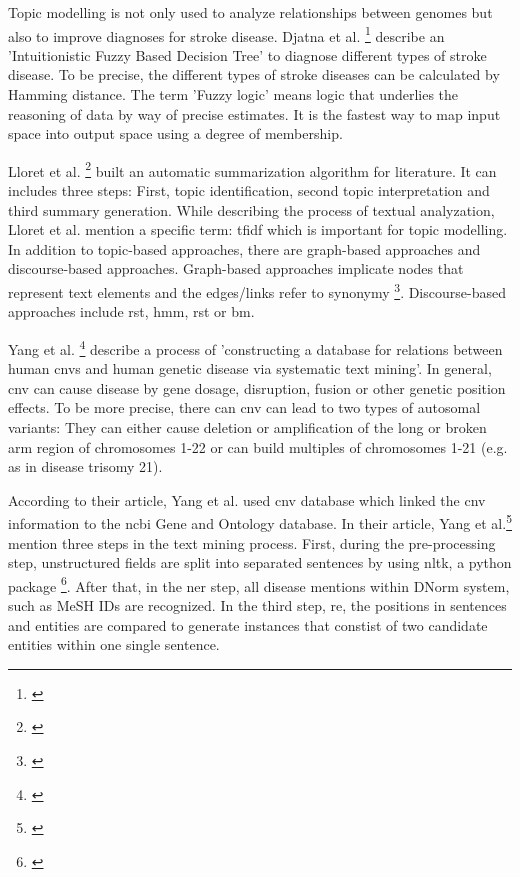 Topic modelling is not only used to analyze relationships between genomes but also to improve diagnoses for stroke disease. Djatna et al. \footnote{\autocite{djatna_2018}} describe an 'Intuitionistic Fuzzy Based Decision Tree' to diagnose different types of stroke disease. To be precise, the different types of stroke diseases can be calculated by Hamming distance. The term 'Fuzzy logic' means logic that underlies the reasoning of data by way of precise estimates. It is the fastest way to map input space into output space using a degree of membership.

Lloret et al. \footnote{\autocite{lloret_2012}} built an automatic summarization algorithm for literature. It can includes three steps: First, topic identification, second topic interpretation and third summary generation. While describing the process of textual analyzation, Lloret et al. mention a specific term: \gls{tfidf} which is important for topic modelling. In addition to topic-based approaches, there are graph-based approaches and discourse-based approaches. Graph-based approaches implicate nodes that represent text elements and the edges/links refer to synonymy \footnote{\autocite{lloret_2012}}. Discourse-based approaches include \gls{rst}, \gls{hmm}, \gls{rst} or \gls{bm}. 

Yang et al. \footnote{\autocite{yang_2018}} describe a process of 'constructing a database for relations between human \gls{cnv}s and human genetic disease via systematic text mining'. In general, \gls{cnv} can cause disease by gene dosage, disruption, fusion or other genetic position effects. 
To be more precise, there can \gls{cnv} can lead to two types of autosomal variants: They can either cause deletion or amplification of the long or broken arm region of chromosomes 1-22 or can build multiples of chromosomes 1-21 (e.g. as in disease trisomy 21). 

According to their article, Yang et al. used \gls{cnv} database which linked the \gls{cnv} information to the \gls{ncbi} Gene and Ontology database. In their article, Yang et al.\footnote{\autocite{yang_2018}} mention three steps in the text mining process. First, during the pre-processing step, unstructured fields are split into separated sentences by using \gls{nltk}, a python package \footnote{\autocite{nltk}}. After that, in the \gls{ner} step, all disease mentions within DNorm system, such as MeSH IDs are recognized. In the third step, \gls{re}, the positions in sentences and entities are compared to generate instances that constist of two candidate entities within one single sentence.


